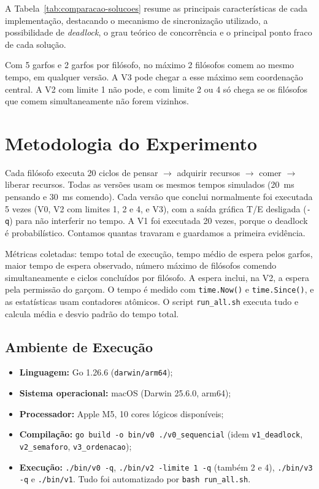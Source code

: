 \documentclass[12pt,brazil,a4paper]{article}
\begin{document}
A Tabela~\ref{tab:comparacao-solucoes} resume as principais características de cada implementação, destacando o mecanismo de sincronização utilizado, a possibilidade de \textit{deadlock}, o grau teórico de concorrência e o principal ponto fraco de cada solução.

Com 5 garfos e 2 garfos por filósofo, no máximo 2 filósofos comem ao mesmo tempo, em qualquer versão. A V3 pode chegar a esse máximo sem coordenação central. A V2 com limite 1 não pode, e com limite 2 ou 4 só chega se os filósofos que comem simultaneamente não forem vizinhos.

\section{Metodologia do Experimento}
Cada filósofo executa 20 ciclos de pensar $\rightarrow$ adquirir recursos $\rightarrow$ comer $\rightarrow$ liberar recursos. Todas as versões usam os mesmos tempos simulados (20~ms pensando e 30~ms comendo). Cada versão que conclui normalmente foi executada 5 vezes (V0, V2 com limites 1, 2 e 4, e V3), com a saída gráfica T/E desligada (\texttt{-q}) para não interferir no tempo. A V1 foi executada 20 vezes, porque o deadlock é probabilístico. Contamos quantas travaram e guardamos a primeira evidência.

Métricas coletadas: tempo total de execução, tempo médio de espera pelos garfos, maior tempo de espera observado, número máximo de filósofos comendo simultaneamente e ciclos concluídos por filósofo. A espera inclui, na V2, a espera pela permissão do garçom. O tempo é medido com \texttt{time.Now()} e \texttt{time.Since()}, e as estatísticas usam contadores atômicos. O script \texttt{run\_all.sh} executa tudo e calcula média e desvio padrão do tempo total.

\subsection{Ambiente de Execução}
\begin{itemize}
\item \textbf{Linguagem:} Go 1.26.6 (\texttt{darwin/arm64});
\item \textbf{Sistema operacional:} macOS (Darwin 25.6.0, arm64);
\item \textbf{Processador:} Apple M5, 10 cores lógicos disponíveis;
\item \textbf{Compilação:} \texttt{go build -o bin/v0 ./v0\_sequencial} (idem \texttt{v1\_deadlock}, \texttt{v2\_semaforo}, \texttt{v3\_ordenacao});
\item \textbf{Execução:} \texttt{./bin/v0 -q}, \texttt{./bin/v2 -limite 1 -q} (também 2 e 4), \texttt{./bin/v3 -q} e \texttt{./bin/v1}. Tudo foi automatizado por \texttt{bash run\_all.sh}.
\end{itemize}
\end{document}
